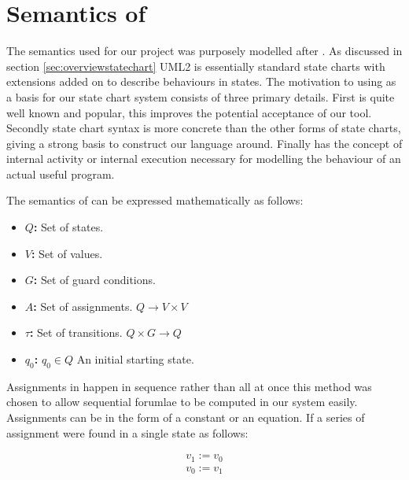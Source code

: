 \section{Semantics of \plcchart}

The semantics used for our project was purposely modelled after \cite{UML2}. As discussed in section \ref{sec:overviewstatechart} UML2 is essentially standard state charts with extensions added on to describe behaviours in states. The motivation to using \cite{UML2} as a basis for our state chart system consists of three primary details. First \cite{UML2} is quite well known and popular, this improves the potential acceptance of our tool. Secondly \cite{UML2} state chart syntax is more concrete than the other forms of state charts, giving a strong basis to construct our language around. Finally \cite{UML2} has the concept of internal activity or internal execution necessary for modelling the behaviour of an actual useful program.

The semantics of \plcchart can be expressed mathematically as follows:

\begin{definition}
	\plcchart
	
\begin{itemize}
	\item \textbf{$Q$:} Set of states.
	\item \textbf{$V$:} Set of values.
	\item \textbf{$G$:} Set of guard conditions.
	\item \textbf{$A$:} Set of assignments. $Q \rightarrow V \times V$
	\item \textbf{$\tau$:} Set of transitions. $Q \times G \rightarrow Q$
	\item \textbf{$q_0$:} $q_0 \in Q$ An initial starting state.
\end{itemize}
\end{definition}

Assignments in \plccharts happen in sequence rather than all at once this method was chosen to allow sequential forumlae to be computed in our system easily. Assignments can be in the form of a constant or an equation. If a series of assignment were found in a single state as follows:

\begin{align}
v_1 := v_0 \label{eqn:assign0} \\ 
v_0 := v_1 \label{eqn:assign1}
\end{align}

